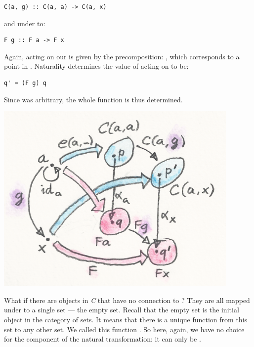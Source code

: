 \begin{Verbatim}[commandchars=\\\{\}]
C(a, g) :: C(a, a) -> C(a, x)
\end{Verbatim}

and under  to:

\begin{Verbatim}[commandchars=\\\{\}]
F g :: F a -> F x
\end{Verbatim}

Again,  acting on our  is given by the
precomposition: , which corresponds to a point
 in . Naturality determines the value
of  acting on  to be:

\begin{Verbatim}[commandchars=\\\{\}]
q' = (F g) q
\end{Verbatim}

Since  was arbitrary, the whole function  is
thus determined.

\includegraphics{images/yoneda5.png}

What if there are objects in \emph{C} that have no connection to
? They are all mapped under  to a single set
--- the empty set. Recall that the empty set is the initial object in
the category of sets. It means that there is a unique function from this
set to any other set. We called this function . So here,
again, we have no choice for the component of the natural
transformation: it can only be .

